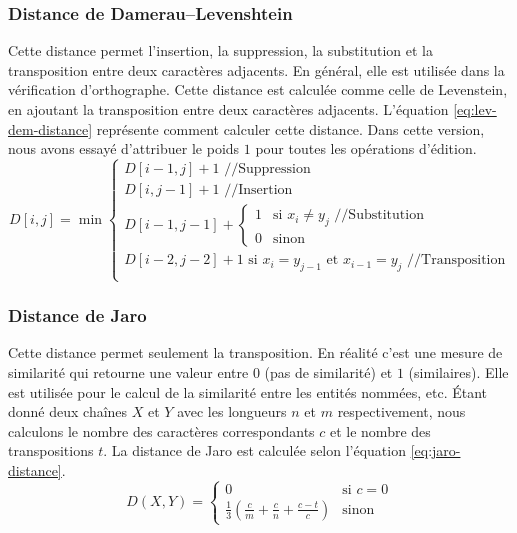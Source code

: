 \documentclass{KodeBook}
\begin{document}
\subsubsection{Distance de Damerau–Levenshtein}

Cette distance permet l'insertion, la suppression, la substitution et la transposition entre deux caractères adjacents.
En général, elle est utilisée dans la vérification d'orthographe.
Cette distance est calculée comme celle de Levenstein, en ajoutant la transposition entre deux caractères adjacents.
L'équation \ref{eq:lev-dem-distance} représente comment calculer cette distance.
Dans cette version, nous avons essayé d'attribuer le poids $1$ pour toutes les opérations d'édition.
\begin{equation}
D[i, j] = \min 
	\begin{cases}
		D[i - 1, j] + 1 \text{ //Suppression}\\
		D[i, j-1] + 1 \text{ //Insertion}\\
		D[i-1, j-1] + \begin{cases}
			1 & \text{si } x_i \ne y_j \text{ //Substitution}\\
			0 & \text{sinon}
		\end{cases}\\
		D[i-2, j-2] + 1 \text{ si } x_i = y_{j-1} \text{ et } x_{i-1} = y_j \text{ //Transposition}\\
	\end{cases}
	\label{eq:lev-dem-distance}
\end{equation}

\subsubsection{Distance de Jaro}

Cette distance permet seulement la transposition.
En réalité c'est une mesure de similarité qui retourne une valeur entre $0$ (pas de similarité) et $1$ (similaires). 
Elle est utilisée pour le calcul de la similarité entre les entités nommées, etc.
Étant donné deux chaînes $X$ et $Y$ avec les longueurs $n$ et $m$ respectivement, nous calculons le nombre des caractères correspondants $c$ et le nombre des transpositions $t$. 
La distance de Jaro est calculée selon l'équation \ref{eq:jaro-distance}.
\begin{equation}
	D(X, Y) = 
	\begin{cases}
	0 & \text{si } c = 0\\
	\frac{1}{3} (\frac{c}{m} + \frac{c}{n} + \frac{c-t}{c}) & \text{sinon}
	\end{cases}
	\label{eq:jaro-distance}
\end{equation}
\end{document}

